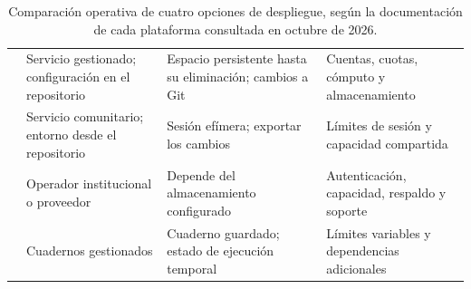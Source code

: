 \begin{table}[tbp]
\caption{Comparación operativa de cuatro opciones de despliegue, según la documentación de cada plataforma consultada en octubre de 2026.}\label{tab:plataformas}
\begin{tabularx}{\linewidth}{@{}>{\RaggedRight\arraybackslash}p{24mm}YYY@{}}
\toprule
{} &  &  &  \\
\midrule
{} & Servicio gestionado; configuración en el repositorio & Espacio persistente hasta su eliminación; cambios a Git & Cuentas, cuotas, cómputo y almacenamiento \\
\addlinespace
{} & Servicio comunitario; entorno desde el repositorio & Sesión efímera; exportar los cambios & Límites de sesión y capacidad compartida \\
\addlinespace
{} & Operador institucional o proveedor & Depende del almacenamiento configurado & Autenticación, capacidad, respaldo y soporte \\
\addlinespace
{} & Cuadernos gestionados & Cuaderno guardado; estado de ejecución temporal & Límites variables y dependencias adicionales \\
\bottomrule
\end{tabularx}
\end{table}
